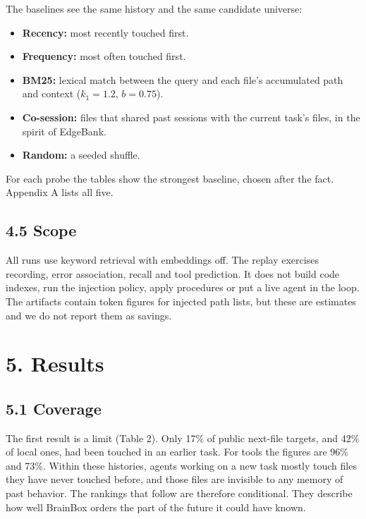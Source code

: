 \documentclass[
  american,
  11pt,
]{article}
\providecommand{\tightlist}{%
  \setlength{\itemsep}{0pt}\setlength{\parskip}{0pt}}
\begin{document}
The baselines see the same history and the same candidate universe:

\begin{itemize}
\tightlist
\item
  \textbf{Recency:} most recently touched first.
\item
  \textbf{Frequency:} most often touched first.
\item
  \textbf{BM25:} lexical match between the query and each file's accumulated path and context (\(k_1=1.2\),
  \(b=0.75\)).
\item
  \textbf{Co-session:} files that shared past sessions with the current task's files, in the spirit of
  EdgeBank.
\item
  \textbf{Random:} a seeded shuffle.
\end{itemize}

For each probe the tables show the strongest baseline, chosen after the fact. Appendix A lists all five.

\subsection{4.5 Scope}\label{scope}

All runs use keyword retrieval with embeddings off. The replay exercises recording, error association, recall
and tool prediction. It does not build code indexes, run the injection policy, apply procedures or put a live
agent in the loop. The artifacts contain token figures for injected path lists, but these are estimates and we
do not report them as savings.

\section{5. Results}\label{results}

\subsection{5.1 Coverage}\label{coverage}

The first result is a limit (Table 2). Only 17\% of public next-file targets, and 42\% of local ones, had been
touched in an earlier task. For tools the figures are 96\% and 73\%. Within these histories, agents working on
a new task mostly touch files they have never touched before, and those files are invisible to any memory of
past behavior. The rankings that follow are therefore conditional. They describe how well BrainBox orders the
part of the future it could have known.
\end{document}
